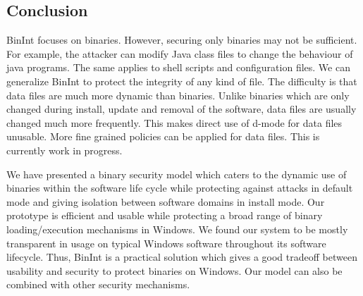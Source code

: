 \subsection{Conclusion}
\label{sec:binint-conc}

BinInt focuses on binaries.
However, securing only binaries may not be sufficient.
For example, the attacker can modify Java class files to
change the behaviour of java programs.
The same applies to shell scripts and configuration files.
We can generalize BinInt to protect the integrity of any kind of file.
The difficulty is that data files are much more dynamic than binaries.
Unlike binaries which are only changed during install, update and removal
of the software, data files are usually changed much more frequently.
This makes direct use of d-mode for data files unusable.
More fine grained policies can be applied for data files.
This is currently work in progress.

We have presented a binary security model which caters to the
dynamic use of binaries within the software life cycle
while protecting against attacks in default mode
and giving isolation between software domains in install mode.
Our prototype is efficient and usable while
protecting a broad range of binary loading/execution mechanisms in Windows.
We found our system to be mostly transparent in usage on typical
Windows software throughout its software lifecycle.
Thus, BinInt is a practical solution
which gives a good tradeoff between usability and security
to protect binaries on Windows.
Our model can also be combined with other security mechanisms.

